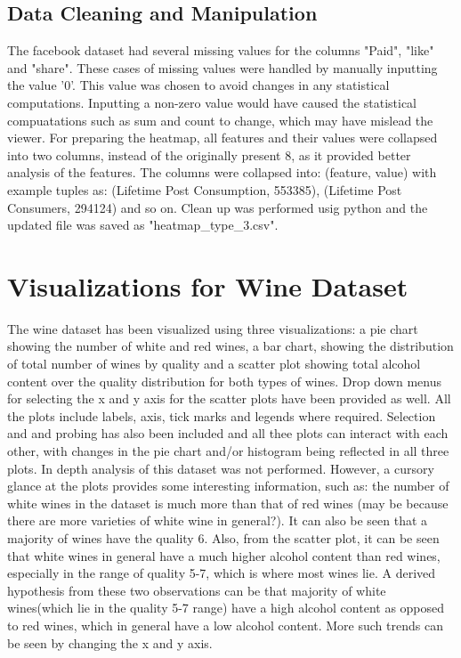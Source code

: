 \documentclass{article}
\begin{document}
\subsection*{Data Cleaning and Manipulation}
The facebook dataset had several missing values for the columns "Paid", "like" and "share". These cases of missing values were handled by manually inputting the value '0'. This value was chosen to avoid changes in any statistical computations. Inputting a non-zero value would have caused the statistical compuatations such as sum and count to change, which may have mislead the viewer. For preparing the heatmap, all features and their values were collapsed into two columns, instead of the originally present 8, as it provided better analysis of the features. The columns were collapsed into: (feature, value) with example tuples as: (Lifetime Post Consumption, 553385), (Lifetime Post Consumers, 294124) and so on. Clean up was performed usig python and the updated file was saved as "heatmap\_type\_3.csv". 

\newpage 
\section*{Visualizations for Wine Dataset}
The wine dataset has been visualized using three visualizations: a pie chart showing the number of white and red wines, a bar chart, showing the distribution of total number of wines by quality and a scatter plot showing total alcohol content over the quality distribution for both types of wines. Drop down menus for selecting the x and y axis for the scatter plots have been provided as well. All the plots include labels, axis, tick marks and legends where required. Selection and and probing has also been included and all thee plots can interact with each other, with changes in the pie chart and/or histogram being reflected in all three plots. In depth analysis of this dataset was not performed. However, a cursory glance at the plots provides some interesting information, such as: the number of white wines in the dataset is much more than that of red wines (may be because there are more varieties of white wine in general?). It can also be seen that a majority of wines have the quality 6. Also, from the scatter plot, it can be seen that white wines in general have a much higher alcohol content than red wines, especially in the range of quality 5-7, which is where most wines lie. A derived hypothesis from these two observations can be that majority of white wines(which lie in the quality 5-7 range) have a high alcohol content as opposed to red wines, which in general have a low alcohol content. More such trends can be seen by changing the x and y axis. 
\end{document}
